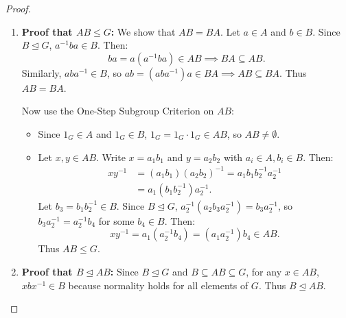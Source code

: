 \begin{proof}
\begin{enumerate}[label=\textbf{(\roman*)}, leftmargin=*, itemsep=8pt]
    \item \textbf{Proof that $AB \le G$:}
    We show that $AB = BA$.
    Let $a \in A$ and $b \in B$.
    Since $B \trianglelefteq G$, $a^{-1}ba \in B$.
    Then:
    \begin{equation*}
    ba = a(a^{-1}ba) \in AB \implies BA \subseteq AB.
    \end{equation*}
    Similarly, $aba^{-1} \in B$, so $ab = (aba^{-1})a \in BA \implies AB \subseteq BA$.
    Thus $AB = BA$.
    
    Now use the One-Step Subgroup Criterion on $AB$:
    \begin{itemize}[leftmargin=1.5em, itemsep=3pt]
        \item Since $1_G \in A$ and $1_G \in B$, $1_G = 1_G \cdot 1_G \in AB$, so $AB \ne \emptyset$.
        \item Let $x, y \in AB$. Write $x = a_1 b_1$ and $y = a_2 b_2$ with $a_i \in A, b_i \in B$.
        Then:
        \begin{align*}
        xy^{-1} &= (a_1 b_1)(a_2 b_2)^{-1} = a_1 b_1 b_2^{-1} a_2^{-1} \\
        &= a_1 (b_1 b_2^{-1}) a_2^{-1}.
        \end{align*}
        Let $b_3 = b_1 b_2^{-1} \in B$. Since $B \trianglelefteq G$, $a_2^{-1}(a_2 b_3 a_2^{-1}) = b_3 a_2^{-1}$, so $b_3 a_2^{-1} = a_2^{-1} b_4$ for some $b_4 \in B$.
        Then:
        \begin{equation*}
        xy^{-1} = a_1 (a_2^{-1} b_4) = (a_1 a_2^{-1}) b_4 \in AB.
        \end{equation*}
        Thus $AB \le G$.
    \end{itemize}

    \item \textbf{Proof that $B \trianglelefteq AB$:}
    Since $B \trianglelefteq G$ and $B \subseteq AB \subseteq G$, for any $x \in AB$, $xbx^{-1} \in B$ because normality holds for all elements of $G$. Thus $B \trianglelefteq AB$.


\end{enumerate}
\end{proof}
